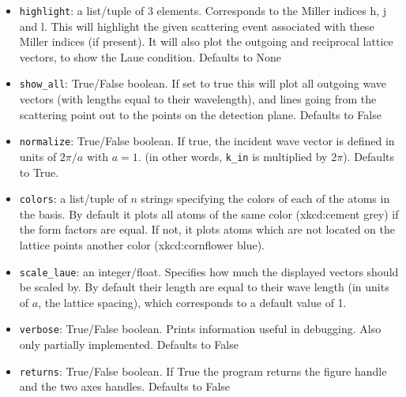 \documentclass[a4paper,11pt]{article}
\numberwithin{equation}{section}
\begin{document}
	\begin{itemize}
		\item \texttt{highlight}: a list/tuple of 3 elements. Corresponds to the Miller indices h, j and l. This will highlight the given scattering event associated with these Miller indices (if present). It will also plot the outgoing and reciprocal lattice vectors, to show the Laue condition. Defaults to None
		\item \texttt{show\_all}: True/False boolean. If set to true this will plot all outgoing wave vectors (with lengths equal to their wavelength), and lines going from the scattering point out to the points on the detection plane. Defaults to False
		\item \texttt{normalize}: True/False boolean. If true, the incident wave vector is defined in units of $ 2\pi/a $ with $ a=1 $. (in other words, \texttt{k\_in} is multiplied by $ 2\pi $). Defaults to True.
		\item \texttt{colors}: a list/tuple of $ n $ strings specifying the colors of each of the atoms in the basis. By default it plots all atoms of the same color (xkcd:cement grey) if the form factors are equal. If not, it plots atoms which are not located on the lattice points another color (xkcd:cornflower blue).
		\item \texttt{scale\_laue}: an integer/float. Specifies how much the displayed vectors should be scaled by. By default their length are equal to their wave length (in units of $ a $, the lattice spacing), which corresponds to a default value of 1. 
		\item \texttt{verbose}: True/False boolean. Prints information useful in debugging. Also only partially implemented. Defaults to False
		\item \texttt{returns}: True/False boolean. If True the program returns the figure handle and the two axes handles. Defaults to False
	\end{itemize}
\end{document}
